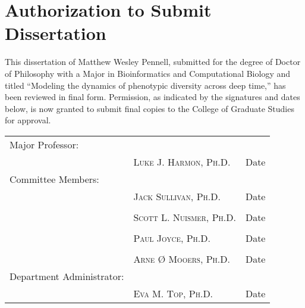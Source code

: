 \chapter*{Authorization to Submit Dissertation}

This dissertation of Matthew Wesley Pennell, submitted for the degree of Doctor of Philosophy with a Major in Bioinformatics and Computational Biology and titled ``Modeling the dynamics of phenotypic diversity across deep time,'' has been reviewed in final form. Permission, as indicated by the signatures and dates below, is now granted to submit final copies to the College of Graduate Studies for approval.

\vspace{1in}

\begin{center}
\begin{tabular}{ p{}  p{}  p{} }
Major Professor: & \hrulefill & \hrulefill\\[-8pt]
 & \textsc{Luke J. Harmon, Ph.D.} & Date\\[18pt]
Committee Members: & \hrulefill & \hrulefill\\[-8pt]
 & \textsc{Jack Sullivan, Ph.D.} & Date\\[18pt]
 & \hrulefill & \hrulefill\\[-8pt]
 & \textsc{Scott L. Nuismer, Ph.D.} & Date\\[18pt]
& \hrulefill & \hrulefill\\[-8pt]
 & \textsc{Paul Joyce, Ph.D.} & Date\\[18pt]
& \hrulefill & \hrulefill\\[-8pt]
 & \textsc{Arne {\O} Mooers, Ph.D.} & Date\\[18pt]
Department Administrator: & \hrulefill & \hrulefill\\[-8pt]
 & \textsc{Eva M. Top, Ph.D.} & Date\\[18pt]
\end{tabular}
\end{center}


 
